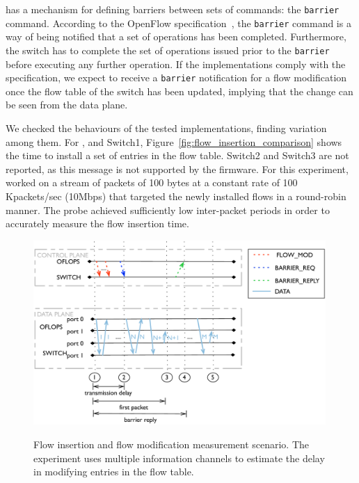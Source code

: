 \of has a mechanism for defining barriers between sets of commands: the
\texttt{barrier} command. According to the OpenFlow
specification~, the \texttt{barrier} command is a way of being
notified that a set of \of operations has been completed. Furthermore, the switch
has to complete the set of operations issued prior to the \texttt{barrier}
before executing any further operation. If the \of implementations comply with
the specification, we expect to receive a \texttt{barrier} notification for a
flow modification once the flow table of the switch has been updated, implying
that the change can be seen from the data plane.

We checked the behaviours of the tested \of implementations, finding variation among
them. For \ovs, and Switch1, Figure~\ref{fig:flow_insertion_comparison} shows the
time to install a set of entries in the flow table. Switch2 and Switch3 are not
reported, as this \of message is not supported by the firmware.  For this
experiment, \oflops worked on a stream of packets of 100 bytes at a constant
rate of 100 Kpackets/sec (10Mbps) that targeted the newly installed flows in a
round-robin manner. The probe achieved sufficiently low inter-packet periods in
order to accurately measure the flow insertion time.

\begin{figure}[h]
  \centering
    \includegraphics[width=0.99\textwidth]{Chapter1/Chapter1Figs/flow_insertion_seq_diagram} 
    \label{fig:flow_mod_scenario}
    \caption{Flow insertion and flow modification measurement scenario. The
      experiment uses multiple information channels to estimate the delay in
      modifying entries in the flow table.}
\end{figure}


